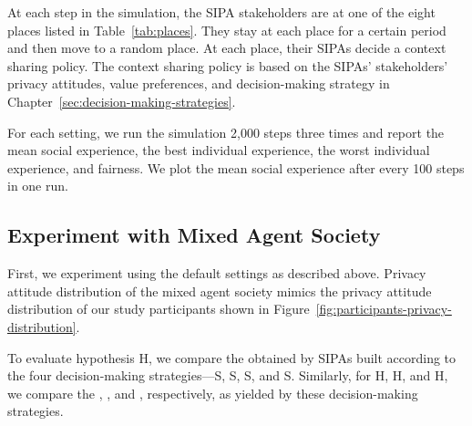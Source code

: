 At each step in the simulation, the SIPA stakeholders are at one of the eight places listed in Table~\ref{tab:places}. They stay at each place for a certain period and then move to a random place. At each place, their SIPAs decide a context sharing policy. The context sharing policy is based on the SIPAs' stakeholders' privacy attitudes, value preferences, and decision-making strategy in Chapter~\ref{sec:decision-making-strategies}.  



For each setting, we run the simulation 2,000 steps three times and report the mean social experience, the best individual experience, the worst individual experience, and fairness. We plot the mean social experience after every 100 steps in one run. 

\subsection{Experiment with Mixed Agent Society}

First, we experiment using the default settings as described above. Privacy attitude distribution of the mixed agent society mimics the privacy attitude distribution of our study participants  shown in Figure~\ref{fig:participants-privacy-distribution}.

To evaluate hypothesis H, we compare the  obtained by SIPAs built according to the four decision-making strategies---S\fsub{\frameworkAinur}, S, S, and S. Similarly, for H, H, and H, we compare the , , and , respectively, as yielded by these decision-making strategies. 

